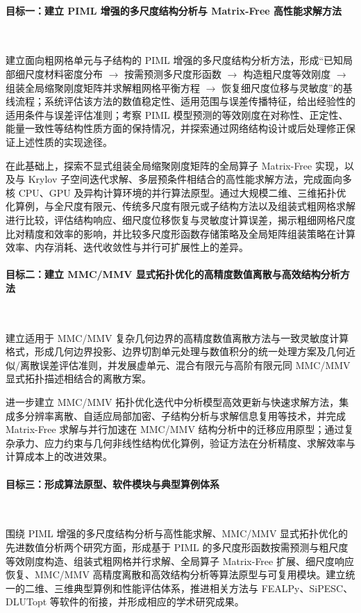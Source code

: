 \documentclass[zihao=-4,a4paper]{ctexart}
\newcommand{\arrowto}{ $\rightarrow$ }
\begin{document}
\paragraph*{目标一：建立 PIML 增强的多尺度结构分析与 Matrix-Free 高性能求解方法}~

建立面向粗网格单元与子结构的 PIML 增强的多尺度结构分析方法，形成``已知局部细尺度材料密度分布\arrowto 按需预测多尺度形函数\arrowto 构造粗尺度等效刚度\arrowto 组装全局缩聚刚度矩阵并求解粗网格平衡方程\arrowto 恢复细尺度位移与灵敏度''的基线流程；系统评估该方法的数值稳定性、适用范围与误差传播特征，给出经验性的适用条件与误差评估准则；考察 PIML 模型预测的等效刚度在对称性、正定性、能量一致性等结构性质方面的保持情况，并探索通过网络结构设计或后处理修正保证上述性质的实现途径。

在此基础上，探索不显式组装全局缩聚刚度矩阵的全局算子 Matrix-Free 实现，以及与 Krylov 子空间迭代求解、多层预条件相结合的高性能求解方法，完成面向多核 CPU、GPU 及异构计算环境的并行算法原型。通过大规模二维、三维拓扑优化算例，与全尺度有限元、传统多尺度有限元或子结构方法以及组装式粗网格求解进行比较，评估结构响应、细尺度位移恢复与灵敏度计算误差，揭示粗细网格尺度比对精度和效率的影响，并比较多尺度形函数存储策略及全局矩阵组装策略在计算效率、内存消耗、迭代收敛性与并行可扩展性上的差异。

\paragraph*{目标二：建立 MMC/MMV 显式拓扑优化的高精度数值离散与高效结构分析方法}~

建立适用于 MMC/MMV 复杂几何边界的高精度数值离散方法与一致灵敏度计算格式，形成几何边界投影、边界切割单元处理与数值积分的统一处理方案及几何近似/离散误差评估准则，并发展虚单元、混合有限元与高阶有限元同 MMC/MMV 显式拓扑描述相结合的离散方案。

进一步建立 MMC/MMV 拓扑优化迭代中分析模型高效更新与快速求解方法，集成多分辨率离散、自适应局部加密、子结构分析与求解信息复用等技术，并完成 Matrix-Free 求解与并行加速在 MMC/MMV 结构分析中的迁移应用原型；通过复杂承力、应力约束与几何非线性结构优化算例，验证方法在分析精度、求解效率与计算成本上的改进效果。

\paragraph*{目标三：形成算法原型、软件模块与典型算例体系}~

围绕 PIML 增强的多尺度结构分析与高性能求解、MMC/MMV 显式拓扑优化的先进数值分析两个研究方面，形成基于 PIML 的多尺度形函数按需预测与粗尺度等效刚度构造、组装式粗网格并行求解、全局算子 Matrix-Free 扩展、细尺度响应恢复、MMC/MMV 高精度离散和高效结构分析等算法原型与可复用模块。建立统一的二维、三维典型算例和性能评估体系，推进相关方法与 FEALPy、SiPESC、DLUTopt 等软件的衔接，并形成相应的学术研究成果。
\end{document}
